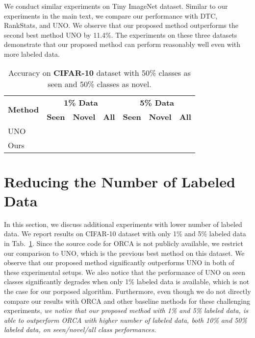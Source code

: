 \documentclass[runningheads]{eccv2022submission}
\begin{document}
We conduct similar experiments on Tiny ImageNet dataset. Similar to our experiments in the main text, we compare our performance with DTC\cite{han2019learning}, RankStats\cite{Han2020Automatically}, and UNO\cite{fini2021unified}. We observe that our proposed method outperforms the second best method UNO by 11.4\%. The experiments on these three datasets demonstrate that our proposed method can perform reasonably well even with more labeled data.   



\begin{table}[h]
\caption{Accuracy on \textbf{CIFAR-10} dataset with 50\% classes as seen and 50\% classes as novel.}
\label{tab:cifar10}
\begin{center}\setlength{\tabcolsep}{4pt}
\small
\begin{tabular}{lccc|ccc}
\hline



\multicolumn{1}{c}{\multirow{2}{*}{\textbf{Method}}} & \multicolumn{3}{c|}{\textbf{1\% Data}} & \multicolumn{3}{c}{\textbf{5\% Data}} \\  
\multicolumn{1}{c}{} & \textbf{Seen} & \textbf{Novel} & \textbf{All}  & \textbf{Seen} & \textbf{Novel} & \textbf{All}\\




\hline
UNO\cite{fini2021unified} &  &  &  &  &  & \\
Ours & {\cellcolor{yellow!15}} & {\cellcolor{yellow!15}} & {\cellcolor{yellow!15}} & {\cellcolor{yellow!15}} & {\cellcolor{yellow!15}} & {\cellcolor{yellow!15}}\\\hline 



\end{tabular}
\end{center}
\vspace{-3mm}
\end{table}



\section{Reducing the Number of Labeled Data}
\label{sec:limited}
In this section, we discuss additional experiments with lower number of labeled data. We report results on CIFAR-10 dataset with only 1\% and 5\% labeled data in Tab.~\ref{tab:cifar10}. Since the source code for ORCA\cite{cao2022openworld} is not publicly available, we restrict our comparison to UNO\cite{fini2021unified}, which is the previous best method on this dataset. We observe that our proposed method significantly outperforms UNO in both of these experimental setups. We also notice that the performance of UNO on seen classes significantly degrades when only 1\% labeled data is available, which is not the case for our porposed algorithm. Furthermore, even though we do not directly compare our results with ORCA and other baseline methods for these challenging experiments, \emph{we notice that our proposed method with 1\% and 5\% labeled data, is able to outperform ORCA with higher number of labeled data, both 10\% and 50\% labeled data, on seen/novel/all class performances.}   
\end{document}
